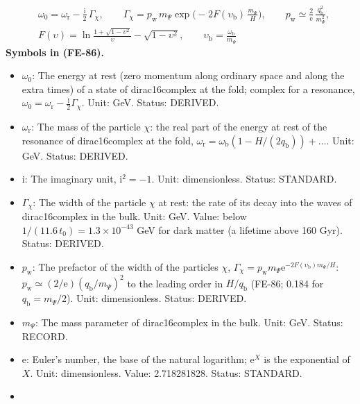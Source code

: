 \documentclass[
  10pt,
]{article}
\providecommand{\tightlist}{%
  \setlength{\itemsep}{0pt}\setlength{\parskip}{0pt}}
\begin{document}
\[
\begin{aligned}
&\omega_0 = \omega_{\mathrm{r}} - \frac{\mathrm{i}}{2}\,\Gamma_\chi,\qquad
\Gamma_\chi = p_{\mathrm{w}}\,m_\Psi\exp\Big(-2F(\upsilon_{\mathrm{b}})\,\frac{m_\Psi}{H}\Big),\qquad
p_{\mathrm{w}} \simeq \frac{2}{\mathrm{e}}\,\frac{q_{\mathrm{b}}^2}{m_\Psi^2},\\
&F(\upsilon) = \ln\frac{1 + \sqrt{1 - \upsilon^2}}{\upsilon} - \sqrt{1 - \upsilon^2},\qquad \upsilon_{\mathrm{b}} = \frac{\omega_{\mathrm{b}}}{m_\Psi}
\end{aligned} \tag{FE-86}
\] \textbf{Symbols in (FE-86).}

\begin{itemize}
\tightlist
\item
  \(\omega_0\): The energy at rest (zero momentum along ordinary space
  and along the extra times) of a state of dirac16complex at the fold;
  complex for a resonance,
  \(\omega_0 = \omega_{\mathrm{r}} - \frac{\mathrm{i}}{2}\Gamma_\chi\).
  Unit: GeV. Status: DERIVED.
\item
  \(\omega_{\mathrm{r}}\): The mass of the particle \(\chi\): the real
  part of the energy at rest of the resonance of dirac16complex at the
  fold,
  \(\omega_{\mathrm{r}} = \omega_{\mathrm{b}}(1 - H/(2q_{\mathrm{b}})) + \dots\).
  Unit: GeV. Status: DERIVED.
\item
  \(\mathrm{i}\): The imaginary unit, \(\mathrm{i}^2 = -1\). Unit:
  dimensionless. Status: STANDARD.
\item
  \(\Gamma_\chi\): The width of the particle \(\chi\) at rest: the rate
  of its decay into the waves of dirac16complex in the bulk. Unit: GeV.
  Value: below \(1/(11.6\,t_0) = 1.3\times10^{-43}\) GeV for dark matter
  (a lifetime above 160 Gyr). Status: DERIVED.
\item
  \(p_{\mathrm{w}}\): The prefactor of the width of the particles
  \(\chi\),
  \(\Gamma_\chi = p_{\mathrm{w}}m_\Psi\mathrm{e}^{-2F(\upsilon_{\mathrm{b}})m_\Psi/H}\):
  \(p_{\mathrm{w}} \simeq (2/\mathrm{e})(q_{\mathrm{b}}/m_\Psi)^2\) to
  the leading order in \(H/q_{\mathrm{b}}\) (FE-86; 0.184 for
  \(q_{\mathrm{b}} = m_\Psi/2\)). Unit: dimensionless. Status: DERIVED.
\item
  \(m_\Psi\): The mass parameter of dirac16complex in the bulk. Unit:
  GeV. Status: RECORD.
\item
  \(\mathrm{e}\): Euler's number, the base of the natural logarithm;
  \(\mathrm{e}^{X}\) is the exponential of \(X\). Unit: dimensionless.
  Value: 2.718281828. Status: STANDARD.
\item

\end{itemize}
\end{document}
